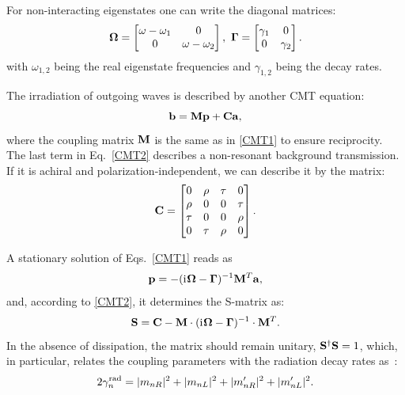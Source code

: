 \documentclass[
    reprint,
    superscriptaddress,
    a4paper,
    amsmath,amssymb,
    prb,
]{revtex4-2}
\newcommand{\iu}{\mathrm{i}\mkern1mu}
\begin{document}
For non-interacting eigenstates one can write the diagonal matrices:
\begin{equation}\label{OmegaGamma}
	{\bf \Omega}=	
	\begin{bmatrix}
		\omega-\omega_1  &  0\\
		0 & \omega-\omega_2  
	\end{bmatrix},\ 
	{\bf \Gamma}=	
	\begin{bmatrix}
		\gamma_1  & 0\\
		0 & \gamma_2  
	\end{bmatrix}.
\end{equation}
with $\omega_{1,2}$ being the real eigenstate frequencies and $\gamma_{1,2}$ being the decay rates. 

The irradiation of outgoing waves is described by another CMT equation:
\begin{equation}\label{CMT2}
	{\bf b}={\bf M}{\bf p}+{\bf C}{\bf a}, 
\end{equation}
where the coupling matrix ${\bf M}$ is the same as in \eqref{CMT1} to ensure reciprocity.
The last term in Eq.~\eqref{CMT2} describes a non-resonant background transmission. If it is achiral and polarization-independent, we can describe it by the matrix:  
\begin{equation}\label{Cmatr}
	{\bf C}=
	\begin{bmatrix}
		0 & \rho & \tau & 0\\
		\rho & 0 & 0 & \tau\\
		\tau & 0 & 0 & \rho\\
		0 & \tau & \rho & 0
	\end{bmatrix}.
\end{equation}

A stationary solution of Eqs.~\eqref{CMT1} reads as
\begin{equation} \label{eq:p_sol}
	\mathbf{p} = - (\iu\mathbf{\Omega} -  \mathbf{\Gamma})^{-1}\mathbf{M}^{T} \mathbf{a},
\end{equation}
and, according to \eqref{CMT2}, it determines the S-matrix as:
\begin{equation}\label{SmatCMT}
	{\bf S}={\bf C}-{\bf M}\cdot (\iu\mathbf{\Omega} -  \mathbf{\Gamma})^{-1} \cdot{\bf M}^T.
\end{equation}
In the absence of dissipation, the matrix should remain  unitary, ${\bf S}^\dag {\bf S}=1$, which, in particular, relates the coupling parameters with the radiation decay rates as~\cite{Fan2003JOSAA}:
\begin{equation}\label{gammarad}
	2\gamma_n^{\rm rad}=|m_{nR}|^2+|m_{nL}|^2+|m^{\prime}_{nR}|^2+|m^{\prime}_{nL}|^2.
\end{equation} 
\end{document}

